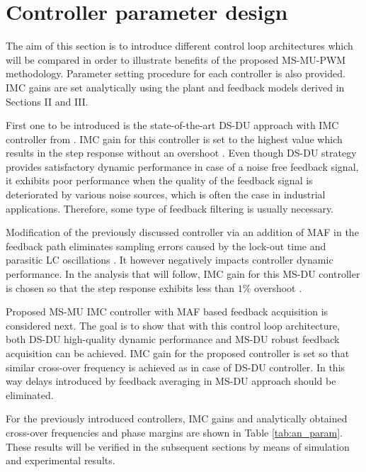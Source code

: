 \documentclass[journal]{IEEEtran}
\begin{document}
\section{Controller parameter design}
The aim of this section is to introduce different control loop architectures which will be compared in order to illustrate benefits of the proposed MS-MU-PWM methodology. Parameter setting procedure for each controller is also provided. IMC gains are set analytically using the plant and feedback models derived in Sections II and III. \par
First one to be introduced is the state-of-the-art DS-DU approach with IMC controller from \cite{vuksa2016}. IMC gain for this controller is set to the highest value which results in the step response without an overshoot \cite{vuksa2016}. Even though DS-DU strategy provides satisfactory dynamic performance in case of a noise free feedback signal, it exhibits poor performance when the quality of the feedback signal is deteriorated by various noise sources, which is often the case in industrial applications. Therefore, some type of feedback filtering is usually necessary. \par
Modification of the previously discussed controller via an addition of MAF in the feedback path eliminates sampling errors caused by the lock-out time and parasitic LC oscillations \cite{vuksa2016}. It however negatively impacts controller dynamic performance. In the analysis that will follow, IMC gain for this MS-DU controller is chosen so that the step response exhibits less than $1\%$ overshoot \cite{vuksa2016}. \par
Proposed MS-MU IMC controller with MAF based feedback acquisition is considered next. The goal is to show that with this control loop architecture, both DS-DU high-quality dynamic performance and MS-DU robust feedback acquisition can be achieved. IMC gain for the proposed controller is set so that similar cross-over frequency is achieved as in case of DS-DU controller. In this way delays introduced by feedback averaging in MS-DU approach should be eliminated. \par
For the previously introduced controllers, IMC gains and analytically obtained cross-over frequencies and phase margins are shown in Table \ref{tab:an_param}. These results will be verified in the subsequent sections by means of simulation and experimental results.\par
\end{document}

